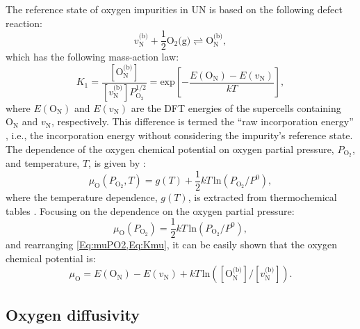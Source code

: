 \documentclass[preprint,12pt,sort&compress]{elsarticle}
\newcommand{\?}{\stackrel{?}{=}}
\begin{document}
The reference state of oxygen impurities in UN is based on the following defect reaction:
\begin{equation}
v_\text{N}^\text{(b)} + \frac{1}{2} \text{O}_2 \text{(g)} \rightleftharpoons \text{O}_\text{N}^\text{(b)},
\end{equation}
which has the following mass-action law:
\begin{equation}
K_1 = \frac{ [ \text{O}_\text{N}^\text{(b)} ] }{ [ v_\text{N}^\text{(b)} ] P_{\text{O}_2}^{1/2} } = \text{exp}\! \left[ - \frac{E( \text{O}_\text{N} ) - E( v_\text{N} )}{kT} \right],
\label{Eq:Kmu}
\end{equation}
where $E( \text{O}_\text{N} )$ and $E( v_\text{N} )$ are the DFT energies of the supercells containing $\text{O}_\text{N}$ and $v_\text{N}$, respectively. This difference is termed the ``raw incorporation energy'' \cite{AbdulHameed2024}, i.e., the incorporation energy without considering the impurity's reference state. The dependence of the oxygen chemical potential on oxygen partial pressure, $P_{\text{O}_2}$, and temperature, $T$, is given by \cite{Finnis2005}:
\begin{equation}
\mu_\text{O}(P_{\text{O}_2}, T) = g(T) + \frac{1}{2} kT \, \text{ln} \!\left( P_{\text{O}_2} / P^0 \right),
\label{Eq:muTPO2}
\end{equation}
where the temperature dependence, $g(T)$, is extracted from thermochemical tables \cite{Linstrom2024}. Focusing on the dependence on the oxygen partial pressure:
\begin{equation}
\mu_\text{O}(P_{\text{O}_2}) = \frac{1}{2} kT \, \text{ln} \!\left( P_{\text{O}_2} / P^0 \right),
\label{Eq:muPO2}
\end{equation}
and rearranging \cref{Eq:muPO2,Eq:Kmu}, it can be easily shown that the oxygen chemical potential is:
\begin{equation}
\mu_\text{O} = E( \text{O}_\text{N} ) - E( v_\text{N} ) + kT \, \text{ln} \! \left( [ \text{O}_\text{N}^\text{(b)} ] / [ v_\text{N}^\text{(b)} ] \right).
\label{Eq:OxygenTruePot}
\end{equation}

\subsection{Oxygen diffusivity}
\label{Sec:Diff}
\end{document}
